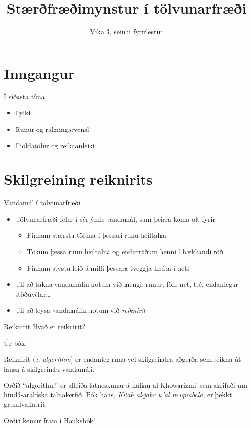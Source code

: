 \documentclass[handout]{beamer}
\title{Stærðfræðimynstur í tölvunarfræði}
\subtitle{Vika 3, seinni fyrirlestur}
\begin{document}
\begin{frame}
\titlepage
\end{frame}

\section{Inngangur}

\begin{frame}{Í síðasta tíma}
\begin{itemize}
 \item Fylki
 \item Runur og rakningarvensl
 \item Fjöldatölur og reiknanleiki
\end{itemize}
\end{frame}

\section{Skilgreining reiknirits}

\begin{frame}{Vandamál í tölvunarfræði}
\begin{itemize}
 \item Tölvunarfræði felur í sér ýmis vandamál, sum þeirra koma oft fyrir
 \begin{itemize}
  \item Finnum stærstu töluna í þessari runu heiltalna
  \item Tökum þessa runu heiltalna og endurröðum henni í hækkandi röð
  \item Finnum stystu leið á milli þessara tveggja hnúta í neti
 \end{itemize}
 \item Til að tákna vandamálin notum við mengi, runur, föll, net, tré, endanlegar stöðuvélar\ldots
 \item Til að leysa vandamálin notum við \emph{reiknirit}
\end{itemize}
\end{frame}

\begin{frame}{Reiknirit}
Hvað er reiknirit? \pause

Úr bók:
\begin{tcolorbox}[title=Reiknirit]
Reiknirit (e. \emph{algorithm}) er endanleg runa vel skilgreindra aðgerða sem reikna út lausn á skilgreindu vandamáli.
\end{tcolorbox}

\pause
Orðið ``algorithm'' er afleiða latneskunar á nafinu al-Khowarizmi, sem skrifaði um hindú-arabíska talnakerfið. Bók hans, \emph{Kitab al-jabr w'al muquabala}, er þekkt grundvallarrit.

\pause
Orðið kemur fram í \href{https://en.wikipedia.org/wiki/Hauksb\%C3\%B3k}{Hauksbók}!
\end{frame}
\end{document}
